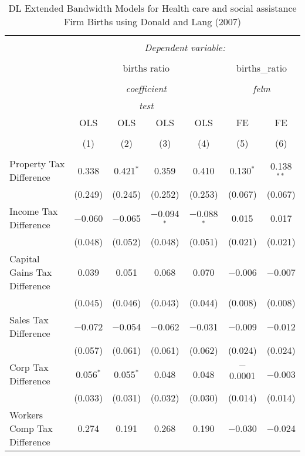 
\begin{table}[!htbp] \centering 
  \caption{DL Extended Bandwidth Models for  Health care and social assistance Firm Births using Donald and Lang (2007)} 
  \label{} 
\begin{tabular}{@{\extracolsep{5pt}}lcccccc} 
\\[-1.8ex]\hline 
\hline \\[-1.8ex] 
 & \multicolumn{6}{c}{\textit{Dependent variable:}} \\ 
\cline{2-7} 
\\[-1.8ex] & \multicolumn{4}{c}{births ratio} & \multicolumn{2}{c}{births\_ratio} \\ 
\\[-1.8ex] & \multicolumn{4}{c}{\textit{coefficient}} & \multicolumn{2}{c}{\textit{felm}} \\ 
 & \multicolumn{4}{c}{\textit{test}} & \multicolumn{2}{c}{\textit{}} \\ 
 & OLS & OLS & OLS & OLS & FE & FE \\ 
\\[-1.8ex] & (1) & (2) & (3) & (4) & (5) & (6)\\ 
\hline \\[-1.8ex] 
 Property Tax Difference & 0.338 & 0.421$^{*}$ & 0.359 & 0.410 & 0.130$^{*}$ & 0.138$^{**}$ \\ 
  & (0.249) & (0.245) & (0.252) & (0.253) & (0.067) & (0.067) \\ 
  Income Tax Difference & $-$0.060 & $-$0.065 & $-$0.094$^{*}$ & $-$0.088$^{*}$ & 0.015 & 0.017 \\ 
  & (0.048) & (0.052) & (0.048) & (0.051) & (0.021) & (0.021) \\ 
  Capital Gains Tax Difference & 0.039 & 0.051 & 0.068 & 0.070 & $-$0.006 & $-$0.007 \\ 
  & (0.045) & (0.046) & (0.043) & (0.044) & (0.008) & (0.008) \\ 
  Sales Tax Difference & $-$0.072 & $-$0.054 & $-$0.062 & $-$0.031 & $-$0.009 & $-$0.012 \\ 
  & (0.057) & (0.061) & (0.061) & (0.062) & (0.024) & (0.024) \\ 
  Corp Tax Difference & 0.056$^{*}$ & 0.055$^{*}$ & 0.048 & 0.048 & $-$0.0001 & $-$0.003 \\ 
  & (0.033) & (0.031) & (0.032) & (0.030) & (0.014) & (0.014) \\ 
  Workers Comp Tax Difference & 0.274 & 0.191 & 0.268 & 0.190 & $-$0.030 & $-$0.024 \\ 

\end{tabular}
\end{table}
